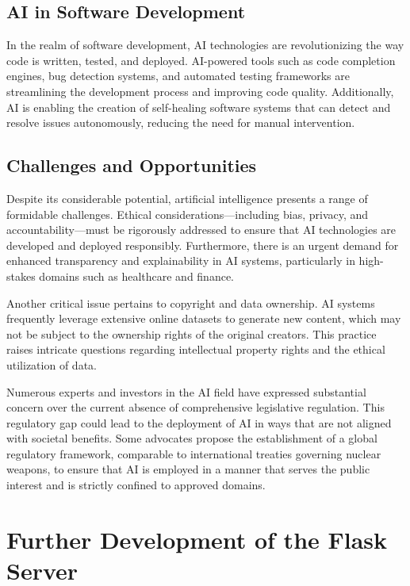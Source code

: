 \subsection{AI in Software Development}

In the realm of software development, AI technologies are revolutionizing the way code is written, tested, and deployed. 
AI-powered tools such as code completion engines, bug detection systems, and automated testing frameworks are streamlining the development process and improving code quality. 
Additionally, AI is enabling the creation of self-healing software systems that can detect and resolve issues autonomously, reducing the need for manual intervention.

\subsection{Challenges and Opportunities}
\label{ref:challanges-and-opportunities}

Despite its considerable potential, artificial intelligence presents a range of formidable challenges. Ethical considerations—including bias, privacy, and accountability—must be rigorously addressed to ensure that AI technologies are developed and deployed responsibly. Furthermore, there is an urgent demand for enhanced transparency and explainability in AI systems, particularly in high-stakes domains such as healthcare and finance.

Another critical issue pertains to copyright and data ownership. AI systems frequently leverage extensive online datasets to generate new content, which may not be subject to the ownership rights of the original creators. This practice raises intricate questions regarding intellectual property rights and the ethical utilization of data.

Numerous experts and investors in the AI field have expressed substantial concern over the current absence of comprehensive legislative 
regulation. This regulatory gap could lead to the deployment of AI in ways that are not aligned with societal benefits. 
Some advocates propose the establishment of a global regulatory framework, comparable to international treaties governing 
nuclear weapons, to ensure that AI is employed in a manner that serves the public interest and is strictly confined to approved domains.
\cite{AI-Risk-Statement}


\section{Further Development of the Flask Server}

